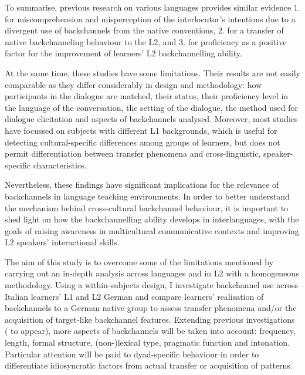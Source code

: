 To summarise, previous research on various languages provides similar evidence 1. for miscomprehension and misperception of the interlocutor’s intentions due to a divergent use of backchannels from the native conventions, 2. for a transfer of native backchanneling behaviour to the L2, and 3. for proficiency as a positive factor for the improvement of learners’ L2 backchannelling ability.

At the same time, these studies have some limitations. Their results are not easily comparable as they differ considerably in design and methodology: how participants in the dialogue are matched, their status, their proficiency level in the language of the conversation, the setting of the dialogue, the method used for dialogue elicitation and aspects of backchannels analysed. Moreover, most studies have focussed on subjects with different L1 backgrounds, which is useful for detecting cultural-specific differences among groups of learners, but does not permit differentiation between transfer phenomena and cross-linguistic, speaker-specific characteristics.

Nevertheless, these findings have significant implications for the relevance of backchannels in language teaching environments. In order to better understand the mechanism behind cross-cultural backchannel behaviour, it is important to shed light on how the backchannelling ability develops in interlanguages, with the goals of raising awareness in multicultural communicative contexts and improving L2 speakers’ interactional skills.

The aim of this study is to overcome some of the limitations mentioned by carrying out an in-depth analysis across languages and in L2 with a homogeneous methodology. Using a within-subjects design, I investigate backchannel use across Italian learners’ L1 and L2 German and compare learners’ realisation of backchannels to a German native group to assess transfer phenomena and/or the acquisition of target-like backchannel features. Extending previous investigations (\citealt{SbrannaEtAl2022} to appear), more aspects of backchannels will be taken into account: frequency, length, formal structure, (non-)lexical type, pragmatic function and intonation. Particular attention will be paid to dyad-specific behaviour in order to differentiate idiosyncratic factors from actual transfer or acquisition of patterns.

